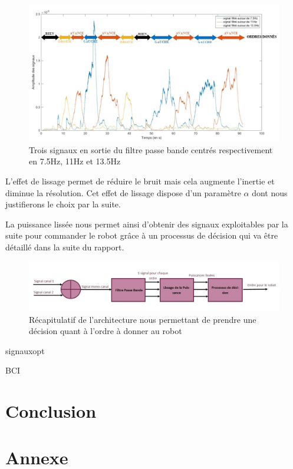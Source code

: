 \documentclass[11pt]{article}
\begin{document}
\begin{figure}[!h]
	\includegraphics[scale=0.75]{images/puissancelissee.jpg}
	\caption{Trois signaux en sortie du filtre passe bande centrés respectivement en 7.5Hz, 11Hz et 13.5Hz}
	\label{fig:duck}
\end{figure}

L'effet de lissage permet de réduire le bruit mais cela augmente l'inertie et diminue la résolution. Cet effet de lissage dispose d'un paramètre $ \alpha $ dont nous justifierons le choix par la suite.

La puissance lissée nous permet ainsi d'obtenir des signaux exploitables par la suite pour commander le robot grâce à un processus de décision qui va être détaillé dans la suite du rapport.

\begin{figure}[!h]
	\includegraphics[scale=0.75]{images/diagramme.jpg}
	\caption{Récapitulatif de l'architecture nous permettant de prendre une décision quant à l'ordre à donner au robot}
	\label{fig:duck}
\end{figure}





\cleardoublepage


{signauxopt}

\cleardoublepage


{BCI}

\section{Conclusion}
\cleardoublepage



\section{Annexe}


\cleardoublepage
\end{document}
